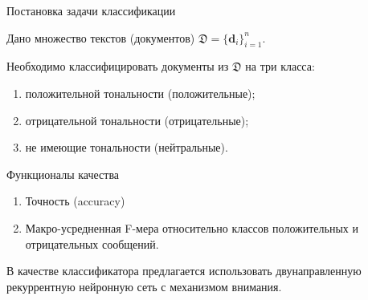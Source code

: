 \documentclass{beamer}
\begin{document}
\begin{frame}{Постановка задачи классификации}
	\begin{block}{}
        Дано множество текстов (документов) $\mathfrak{D} = \{\mathbf{d}_i\}_{i=1}^{n}$.
	\end{block}    
    
    \begin{block}{}
        Необходимо классифицировать документы из $\mathfrak{D}$ на три класса:
        	\begin{enumerate}
			\item положительной тональности (положительные);
			\item отрицательной тональности (отрицательные);
			\item не имеющие тональности (нейтральные).
			\end{enumerate}
	\end{block}
	
	\begin{block}{Функционалы качества}
		\begin{enumerate}
			\item Точность (accuracy)
			\item Макро-усредненная F-мера
			относительно классов положительных и
			отрицательных сообщений.
		\end{enumerate}
	\end{block}
	В качестве классификатора предлагается использовать двунаправленную рекуррентную нейронную сеть с механизмом внимания.
\end{frame}
\end{document}
